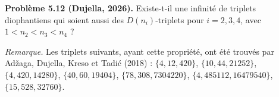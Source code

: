 \textbf{Problème 5.12 (Dujella, 2026).} Existe-t-il une infinité de triplets diophantiens qui soient aussi des $D(n_i)$-triplets pour $i=2,3,4$, avec $1<n_2<n_3<n_4$ ?

\medskip

\textit{Remarque.} Les triplets suivants, ayant cette propriété, ont été trouvés par Adžaga, Dujella, Kreso et Tadić (2018) : $\{4,12,420\}$, $\{10,44,21252\}$, $\{4,420,14280\}$, $\{40,60,19404\}$, $\{78,308,7304220\}$, $\{4,485112,16479540\}$, $\{15,528,32760\}$.
